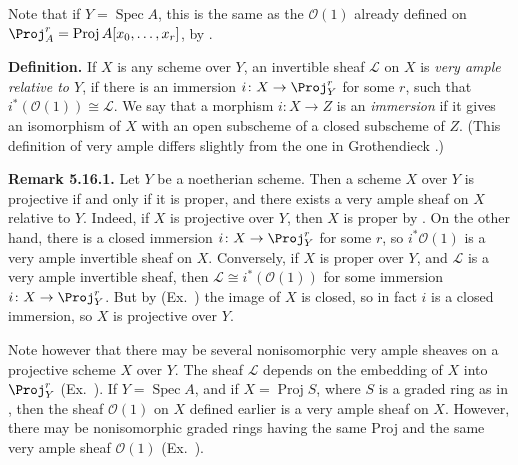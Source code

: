 {Note that if $Y=\operatorname{Spec}A$, this is the same as the $\mathcal O(1)$ already defined on $\Proj_A^r=\operatorname{Proj}A[x_0,\ldots,x_r]$, by .

\medskip
\noindent\textbf{Definition.} If $X$ is any scheme over $Y$, an invertible sheaf $\mathcal L$ on $X$ is \emph{very ample relative to $Y$}, if there is an immersion $i\colon X\to\Proj_Y^r$ for some $r$, such that $i^*(\mathcal O(1))\cong\mathcal L$. We say that a morphism $i\colon X\to Z$ is an \emph{immersion} if it gives an isomorphism of $X$ with an open subscheme of a closed subscheme of $Z$. (This definition of very ample differs slightly from the one in Grothendieck .)

\medskip
\noindent\hypertarget{result-II-5.16.1}{}\textbf{Remark 5.16.1.} Let $Y$ be a noetherian scheme. Then a scheme $X$ over $Y$ is projective if and only if it is proper, and there exists a very ample sheaf on $X$ relative to $Y$. Indeed, if $X$ is projective over $Y$, then $X$ is proper by . On the other hand, there is a closed immersion $i\colon X\to\Proj_Y^r$ for some $r$, so $i^*\mathcal O(1)$ is a very ample invertible sheaf on $X$. Conversely, if $X$ is proper over $Y$, and $\mathcal L$ is a very ample invertible sheaf, then $\mathcal L\cong i^*(\mathcal O(1))$ for some immersion $i\colon X\to\Proj_Y^r$. But by (Ex.~) the image of $X$ is closed, so in fact $i$ is a closed immersion, so $X$ is projective over $Y$.

Note however that there may be several nonisomorphic very ample sheaves on a projective scheme $X$ over $Y$. The sheaf $\mathcal L$ depends on the embedding of $X$ into $\Proj_Y^r$ (Ex.~). If $Y=\operatorname{Spec}A$, and if $X=\operatorname{Proj}S$, where $S$ is a graded ring as in , then the sheaf $\mathcal O(1)$ on $X$ defined earlier is a very ample sheaf on $X$. However, there may be nonisomorphic graded rings having the same Proj and the same very ample sheaf $\mathcal O(1)$ (Ex.~).
}

